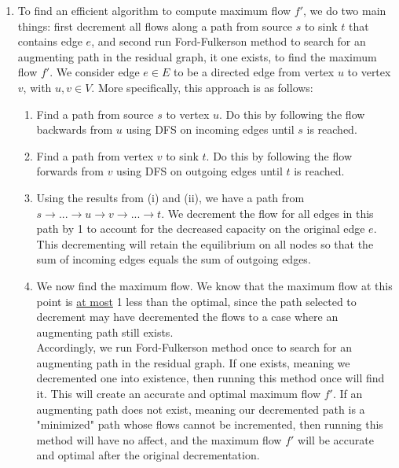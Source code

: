 \documentclass{article}
\begin{document}
\begin{enumerate}
\begin{enumerate}
            \item
            To find an efficient algorithm to compute maximum flow $f'$, we do two main things: first decrement all flows along a path from source $s$ to sink $t$ that contains edge $e$, and second run Ford-Fulkerson method to search for an augmenting path in the residual graph, it one exists, to find the maximum flow $f'$. We consider edge $e \in E$ to be a directed edge from vertex $u$ to vertex $v$, with $u, v \in V$. More specifically, this approach is as follows:
            
            \begin{enumerate}
                \item 
                Find a path from source $s$ to vertex $u$. Do this by following the flow backwards from $u$ using DFS on incoming edges until $s$ is reached.
                
                \item 
                Find a path from vertex $v$ to sink $t$. Do this by following the flow forwards from $v$ using DFS on outgoing edges until $t$ is reached.
                
                \item
                Using the results from (i) and (ii), we have a path from $s \rightarrow ... \rightarrow u \rightarrow v \rightarrow ... \rightarrow t$. We decrement the flow for all edges in this path by 1 to account for the decreased capacity on the original edge $e$. This decrementing will retain the equilibrium on all nodes so that the sum of incoming edges equals the sum of outgoing edges. 
                
                \item
                We now find the maximum flow. We know that the maximum flow at this point is \underline{at most} 1 less than the optimal, since the path selected to decrement may have decremented the flows to a case where an augmenting path still exists. \\
                
                Accordingly, we run Ford-Fulkerson method once to search for an augmenting path in the residual graph. If one exists, meaning we decremented one into existence, then running this method once will find it. This will create an accurate and optimal maximum flow $f'$. If an augmenting path does not exist, meaning our decremented path is a "minimized" path whose flows cannot be incremented, then running this method will have no affect, and the maximum flow $f'$ will be accurate and optimal after the original decrementation. 
                

\end{enumerate}
\end{enumerate}
\end{enumerate}
\end{document}
